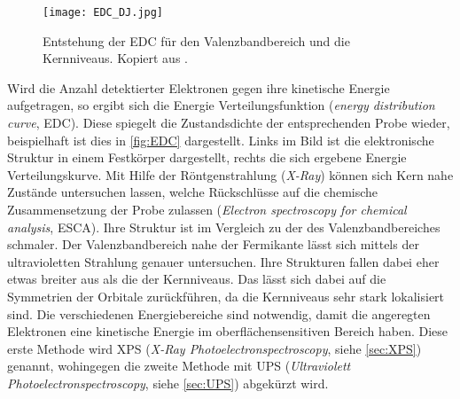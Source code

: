         \begin{figure}
            \centering
            \texttt{[image: EDC\_DJ.jpg]}
            \caption{Entstehung der EDC für den Valenzbandbereich und die Kernniveaus.
            Kopiert aus \cite{oura_surface_2003}.}
            \label{fig:EDC}
        \end{figure}
        Wird die Anzahl detektierter Elektronen gegen ihre kinetische Energie aufgetragen, so ergibt sich die Energie Verteilungsfunktion (\textit{energy distribution curve}, EDC).
        Diese spiegelt die Zustandsdichte der entsprechenden Probe wieder, beispielhaft ist dies in \autoref{fig:EDC} dargestellt.
        Links im Bild ist die elektronische Struktur in einem Festkörper dargestellt, rechts die sich ergebene Energie Verteilungskurve.
        Mit Hilfe der Röntgenstrahlung (\textit{X-Ray}) können sich Kern nahe Zustände untersuchen lassen, welche Rückschlüsse auf die chemische Zusammensetzung der Probe zulassen (\textit{Electron spectroscopy for chemical analysis}, ESCA).
        Ihre Struktur ist im Vergleich zu der des Valenzbandbereiches schmaler.
        Der Valenzbandbereich nahe der Fermikante lässt sich mittels der ultravioletten Strahlung genauer untersuchen.
        Ihre Strukturen fallen dabei eher etwas breiter aus als die der Kernniveaus.
        Das lässt sich dabei auf die Symmetrien der Orbitale zurückführen, da die Kernniveaus sehr stark lokalisiert sind.
        Die verschiedenen Energiebereiche sind notwendig, damit die angeregten Elektronen eine kinetische Energie im oberflächensensitiven Bereich haben.
        Diese erste Methode wird XPS (\textit{X-Ray Photoelectronspectroscopy}, siehe \autoref{sec:XPS}) genannt, wohingegen die zweite Methode mit UPS (\textit{Ultraviolett Photoelectronspectroscopy}, siehe \autoref{sec:UPS}) abgekürzt wird.
        
